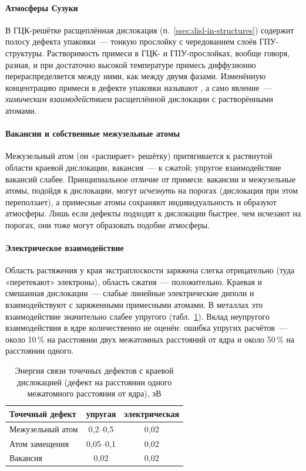 \paragraph{Атмосферы Сузуки}
В ГЦК-решётке расщеплённая дислокация (п.~\ref{ssec:disl-in-structures})
содержит полосу дефекта упаковки~— тонкую прослойку с чередованием слоёв
ГПУ-структуры. Растворимость примеси в ГЦК- и ГПУ-прослойках, вообще
говоря, разная, и при достаточно высокой температуре примесь диффузионно
перераспределяется между ними, как между двумя фазами. Изменённую
концентрацию примеси в дефекте упаковки называют , а само явление~— \emph{химическим взаимодействием} расщеплённой
дислокации с растворёнными атомами.

\paragraph{Вакансии и собственные межузельные атомы}
Межузельный атом (он «распирает» решётку) притягивается к растянутой
области краевой дислокации, вакансия~— к сжатой; упругое взаимодействие
вакансий слабее. Принципиальное отличие от примеси: вакансии и
межузельные атомы, подойдя к дислокации, могут \emph{исчезнуть} на
порогах (дислокация при этом переползает), а примесные атомы сохраняют
индивидуальность и образуют атмосферы. Лишь если дефекты подходят к
дислокации быстрее, чем исчезают на порогах, они тоже могут образовать
подобие атмосферы.

\paragraph{Электрическое взаимодействие}
Область растяжения у края экстраплоскости заряжена слегка отрицательно
(туда «перетекают» электроны), область сжатия~— положительно. Краевая и
смешанная дислокации~— слабые линейные электрические диполи и
взаимодействуют с заряженными примесными атомами. В металлах это
взаимодействие значительно слабее упругого (табл.~\ref{tab:binding}).
Вклад неупругого взаимодействия в ядре количественно не оценён: ошибка
упругих расчётов~— около 10\,\% на расстоянии двух межатомных расстояний
от ядра и около 50\,\% на расстоянии одного.

\begin{table}[ht]
\centering
\caption{Энергия связи точечных дефектов с краевой дислокацией (дефект на
расстоянии одного межатомного расстояния от ядра), эВ}
\label{tab:binding}
\small
\begin{tabular}{@{}lcc@{}}
\toprule
Точечный дефект & упругая & электрическая \\
\midrule
Межузельный атом & 0,2--0,5 & 0,02 \\
Атом замещения & 0,05--0,1 & 0,02 \\
Вакансия & 0,02 & 0,02 \\
\bottomrule
\end{tabular}
\end{table}

